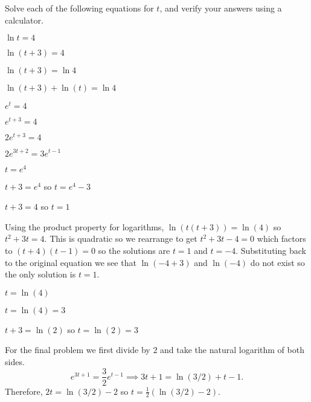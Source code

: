 \begin{activity}\label{A:0.4.2}
    Solve each of the following equations for $t$, and verify your answers using a calculator.
	\ba
		\item $\ln t=4$
		\item $\ln(t+3)=4$
		\item $\ln(t+3)=\ln4$
		\item $\ln(t+3)+\ln(t)=\ln4$
		\item $e^{t}=4$
		\item $e^{t+3}=4$
		\item $2e^{t+3}=4$
		\item $2e^{3t+2}=3e^{t-1}$
	\ea

\end{activity}
\begin{smallhint}
    
\end{smallhint}
\begin{bighint}
    
\end{bighint}
\begin{activitySolution}
    \ba
        \item $t = e^4$
        \item $t+3 = e^4$ so $t = e^4 - 3$
        \item $t+3 = 4$ so $t=1$
        \item Using the product property for logarithms, $\ln(t(t+3)) = \ln(4)$ so $t^2 +
            3t = 4$.  This is quadratic so we rearrange to get $t^2 + 3t - 4 = 0$ which
            factors to $(t+4)(t-1) = 0$ so the solutions are $t=1$ and $t=-4$.
            Substituting back to the original equation we see that $\ln(-4+3)$ and
            $\ln(-4)$ do not exist so the only solution is $t=1$.
        \item $t=\ln(4)$
        \item $t= \ln(4) = 3$
        \item $t+3 = \ln(2)$ so $t = \ln(2) = 3$
        \item For the final problem we first divide by $2$ and take the natural logarithm
            of both sides.
            \[ e^{3t+1} = \frac{3}{2} e^{t-1} \implies 3t+1 = \ln(3/2) + t-1. \]
            Therefore, $2t = \ln(3/2) - 2$ so $t=\frac{1}{2} \left( \ln(3/2) - 2 \right)$.
    \ea
\end{activitySolution}
\aftera
